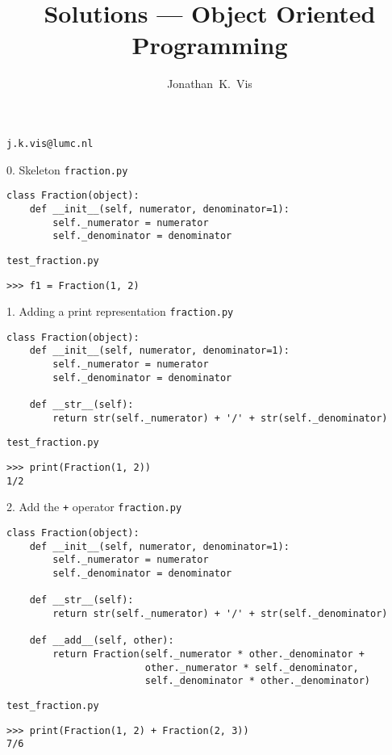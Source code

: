 \documentclass{beamer}
\author{Jonathan~K.~Vis}
\institute[LUMC]{Dept. of Human Genetics, Leiden University Medical Center}
\date{}
\title{Solutions --- Object Oriented Programming}
\begin{document}
\beamertemplatenavigationsymbolsempty

\begin{frame}
\titlepage
\vfill
\hfill \textcolor{pms280_compl}{\texttt{j.k.vis@lumc.nl}}
\end{frame}

\begin{frame}[fragile]{0. Skeleton}
\small
\texttt{fraction.py}
\begin{verbatim}
class Fraction(object):
    def __init__(self, numerator, denominator=1):
        self._numerator = numerator
        self._denominator = denominator
\end{verbatim}

\vfill

\texttt{test\_fraction.py}
\begin{verbatim}
>>> f1 = Fraction(1, 2)
\end{verbatim}
\end{frame}

\begin{frame}[fragile]{1. Adding a print representation}
\small
\texttt{fraction.py}
\begin{verbatim}
class Fraction(object):
    def __init__(self, numerator, denominator=1):
        self._numerator = numerator
        self._denominator = denominator

    def __str__(self):
        return str(self._numerator) + '/' + str(self._denominator)
\end{verbatim}

\vfill

\texttt{test\_fraction.py}
\begin{verbatim}
>>> print(Fraction(1, 2))
1/2
\end{verbatim}
\end{frame}

\begin{frame}[fragile]{2. Add the \texttt{+} operator}
\small
\texttt{fraction.py}
\begin{verbatim}
class Fraction(object):
    def __init__(self, numerator, denominator=1):
        self._numerator = numerator
        self._denominator = denominator

    def __str__(self):
        return str(self._numerator) + '/' + str(self._denominator)

    def __add__(self, other):
        return Fraction(self._numerator * other._denominator +
                        other._numerator * self._denominator,
                        self._denominator * other._denominator)
\end{verbatim}

\vfill

\texttt{test\_fraction.py}
\begin{verbatim}
>>> print(Fraction(1, 2) + Fraction(2, 3))
7/6
\end{verbatim}
\end{frame}
\end{document}
